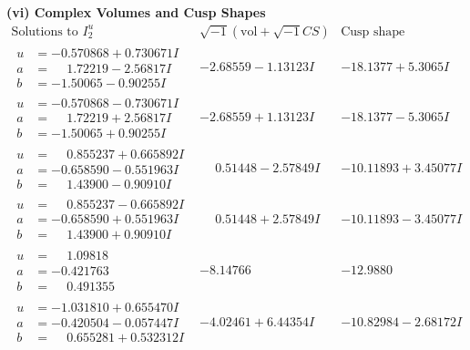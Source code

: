 \documentclass[1p]{elsarticle_modified}
\theoremstyle{definition}
\newcommand{\I}{\sqrt{-1}}
\begin{document}
\newpage\flushleft \textbf{(vi) Complex Volumes and Cusp Shapes}
$$\begin{array}{c|c|c}  
\text{Solutions to }I^u_{2}& \I (\text{vol} + \sqrt{-1}CS) & \text{Cusp shape}\\
 \hline 
\begin{aligned}
u &= -0.570868 + 0.730671 I \\
a &= \phantom{-}1.72219 - 2.56817 I \\
b &= -1.50065 - 0.90255 I\end{aligned}
 & -2.68559 - 1.13123 I & -18.1377 + 5.3065 I \\ \hline\begin{aligned}
u &= -0.570868 - 0.730671 I \\
a &= \phantom{-}1.72219 + 2.56817 I \\
b &= -1.50065 + 0.90255 I\end{aligned}
 & -2.68559 + 1.13123 I & -18.1377 - 5.3065 I \\ \hline\begin{aligned}
u &= \phantom{-}0.855237 + 0.665892 I \\
a &= -0.658590 - 0.551963 I \\
b &= \phantom{-}1.43900 - 0.90910 I\end{aligned}
 & \phantom{-}0.51448 - 2.57849 I & -10.11893 + 3.45077 I \\ \hline\begin{aligned}
u &= \phantom{-}0.855237 - 0.665892 I \\
a &= -0.658590 + 0.551963 I \\
b &= \phantom{-}1.43900 + 0.90910 I\end{aligned}
 & \phantom{-}0.51448 + 2.57849 I & -10.11893 - 3.45077 I \\ \hline\begin{aligned}
u &= \phantom{-}1.09818\phantom{ +0.000000I} \\
a &= -0.421763\phantom{ +0.000000I} \\
b &= \phantom{-}0.491355\phantom{ +0.000000I}\end{aligned}
 & -8.14766\phantom{ +0.000000I} & -12.9880\phantom{ +0.000000I} \\ \hline\begin{aligned}
u &= -1.031810 + 0.655470 I \\
a &= -0.420504 - 0.057447 I \\
b &= \phantom{-}0.655281 + 0.532312 I\end{aligned}
 & -4.02461 + 6.44354 I & -10.82984 - 2.68172 I \\ \hline\begin{aligned}

\end{aligned}
\end{array}$$
\end{document}
